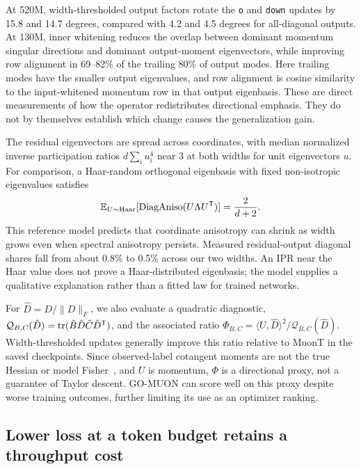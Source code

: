 At 520M, width-thresholded output factors rotate the \texttt{o} and \texttt{down} updates by 15.8 and 14.7 degrees, compared with 4.2 and 4.5 degrees for all-diagonal outputs. At 130M, inner whitening reduces the overlap between dominant momentum singular directions and dominant output-moment eigenvectors, while improving row alignment in 69--82\% of the trailing 80\% of output modes. Here trailing modes have the smaller output eigenvalues, and row alignment is cosine similarity to the input-whitened momentum row in that output eigenbasis. These are direct measurements of how the operator redistributes directional emphasis. They do not by themselves establish which change causes the generalization gain.

The residual eigenvectors are spread across coordinates, with median normalized inverse participation ratios $d\sum_i u_i^4$ near 3 at both widths for unit eigenvectors $u$. For comparison, a Haar-random orthogonal eigenbasis with fixed non-isotropic eigenvalues satisfies
\begin{equation}
 \mathbb{E}_{U\sim\mathrm{Haar}}[\mathrm{DiagAniso}(U\Lambda U^{{\mathsf{T}}})]=\frac{2}{d+2}.
 \label{eq:haar_scaling}
\end{equation}
This reference model predicts that coordinate anisotropy can shrink as width grows even when spectral anisotropy persists. Measured residual-output diagonal shares fall from about 0.8\% to 0.5\% across our two widths. An IPR near the Haar value does not prove a Haar-distributed eigenbasis; the model supplies a qualitative explanation rather than a fitted law for trained networks.

For $\hat D=D/\|D\|_F$, we also evaluate a quadratic diagnostic, $\mathcal Q_{B,C}(\hat D)=\operatorname{tr}(\tilde B\hat D\tilde C\hat D^{{\mathsf{T}}})$, and the associated ratio $\Phi_{B,C}=\langle U,\hat D\rangle^2/\mathcal Q_{B,C}(\hat D)$. Width-thresholded updates generally improve this ratio relative to MuonT in the saved checkpoints. Since observed-label cotangent moments are not the true Hessian or model Fisher~\citep{kunstner2019limitations}, and $U$ is momentum, $\Phi$ is a directional proxy, not a guarantee of Taylor descent. GO-MUON can score well on this proxy despite worse training outcomes, further limiting its use as an optimizer ranking.

\subsection{Lower loss at a token budget retains a throughput cost}
\label{sec:pareto}

